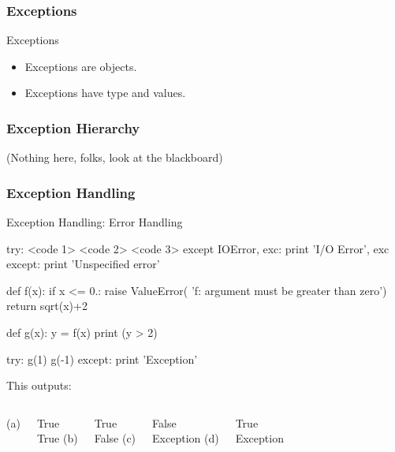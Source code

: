\begin{frame}[fragile]
\frametitle{Exceptions}

\begin{block}{Exceptions}
\begin{itemize}
\item Exceptions are \alert{objects}.
\item Exceptions have \alert{type} and \alert{values}.
\end{itemize}
\end{block}
\end{frame}

\begin{frame}[fragile]
\frametitle{Exception Hierarchy}

(Nothing here, folks, look at the blackboard)

\end{frame}

\begin{frame}[fragile]
\frametitle{Exception Handling}

\begin{block}{Exception Handling: Error Handling}
\begin{python}
try:
    <code 1>
    <code 2>
    <code 3>
except IOError, exc:
    print 'I/O Error', exc
except:
    print 'Unspecified error'
\end{python}
\end{block}
\end{frame}

\begin{frame}[fragile]

\begin{python}
def f(x):
    if x <= 0.:
        raise ValueError(
            'f: argument must be greater than zero')
    return sqrt(x)+2

def g(x):
    y = f(x)
    print (y > 2) 

try:
    g(1)
    g(-1)
except:
    print 'Exception'
\end{python}

This outputs:

\begin{columns}
(a)\par
True\\True
{}
(b)\par
True\\False
{}
(c)\par
False\\Exception
{}
(d)\par
True\\Exception
\end{columns}

\end{frame}

